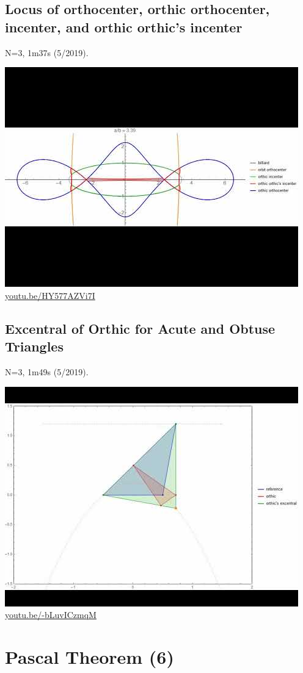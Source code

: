 \documentclass[12pt]{amsart}
\begin{document}
\subsection{Locus of orthocenter, orthic orthocenter, incenter, and orthic orthic's incenter}
\label{vid:HY577AZVi7I}
\noindent N=3, 1m37s (5/2019). 
\begin{center}\includegraphics[width=.5\textwidth]{pics/HY577AZVi7I.jpg} \\ 
\href{https://youtu.be/HY577AZVi7I}{\url{youtu.be/HY577AZVi7I}}\end{center}
% 
\subsection{Excentral of Orthic for Acute and Obtuse Triangles}
\label{vid:-bLuvICzmqM}
\noindent N=3, 1m49s (5/2019). 
\begin{center}\includegraphics[width=.5\textwidth]{pics/-bLuvICzmqM.jpg} \\ 
\href{https://youtu.be/-bLuvICzmqM}{\url{youtu.be/-bLuvICzmqM}}\end{center}
% 

\section{Pascal Theorem (6)}
\end{document}
